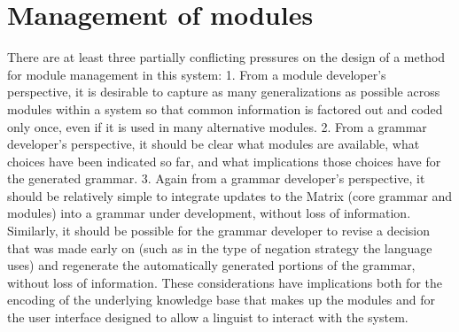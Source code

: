 \section{Management of modules}
\label{management}

There are at least three partially conflicting pressures on the design
of a method for module management in this system: 1. From a module developer's
perspective, it is desirable to capture as many generalizations as
possible across modules within a system so that common information is
factored out and coded only once, even if it is used in many
alternative modules. 2. From a grammar developer's perspective, it should be clear
what modules are available, what choices have been indicated so far,
and what implications those choices have for the generated grammar.
3. Again from a grammar developer's perspective, it should be relatively simple to
integrate updates to the Matrix (core grammar and modules) into a
grammar under development, without loss of information.
Similarly, it should be possible for the grammar
developer to revise a decision that was made early on (such as in the
type of negation strategy the language uses) and regenerate the
automatically generated portions of the grammar, without loss of
information.  These considerations have implications both for the
encoding of the underlying knowledge base that makes up the modules
and for the user interface designed to allow a linguist to interact
with the system.


